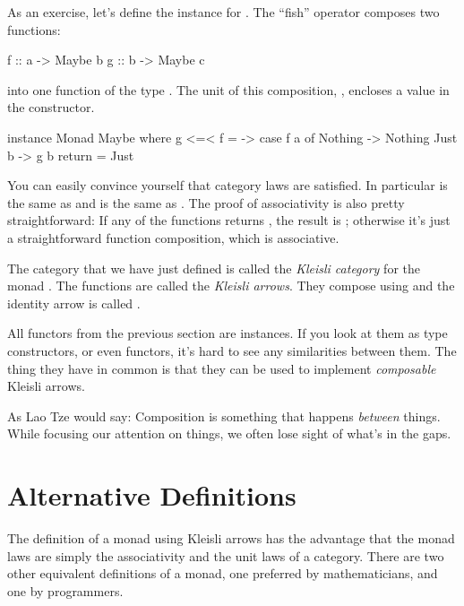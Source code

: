 \documentclass[DaoFP]{subfiles}
\begin{document}
As an exercise, let's define the  instance for . The ``fish'' operator \hask{<=<} composes two functions:
\begin{haskell}
f :: a -> Maybe b
g :: b -> Maybe c
\end{haskell}
into one function of the type . The unit of this composition, , encloses a value in the  constructor.
\begin{haskell}
instance Monad Maybe where
  g <=< f = \a -> case f a of
                    Nothing -> Nothing
                    Just b -> g b
  return = Just  
\end{haskell}

You can easily convince yourself that category laws are satisfied. In particular  is the same as  and  is the same as . The proof of associativity is also pretty straightforward: If any of the functions returns , the result is ; otherwise it's just a straightforward function composition, which is associative.

The category that we have just defined is called the \emph{Kleisli category} for the monad . The functions  are called the \emph{Kleisli arrows}. They compose using \hask{<=<} and the identity arrow is called .

All functors from the previous section are  instances. If you look at them as type constructors, or even functors, it's hard to see any similarities between them. The thing they have in common is that they can be used to implement \emph{composable} Kleisli arrows. 

As Lao Tze would say: Composition is something that happens \emph{between} things. While focusing our attention on things, we often lose sight of what's in the gaps. 

\section{Alternative Definitions}

The definition of a monad using Kleisli arrows has the advantage that the monad laws are simply the associativity and the unit laws of a category. There are two other equivalent definitions of a monad, one preferred by mathematicians, and one by programmers. 
\end{document}

